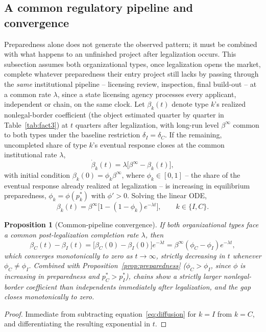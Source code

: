 \documentclass[english,12pt]{article}
\newtheorem{proposition}{Proposition}
\begin{document}
\subsection{A common regulatory pipeline and convergence}
\label{sec:diffusion}

Preparedness alone does not generate the observed pattern; it must be combined with what happens to an unfinished project after legalization occurs. This subsection assumes both organizational types, once legalization opens the market, complete whatever preparedness their entry project still lacks by passing through the \emph{same} institutional pipeline -- licensing review, inspection, final build-out -- at a common rate $\lambda$, since a state licensing agency processes every applicant, independent or chain, on the same clock. Let $\beta_k(t)$ denote type $k$'s realized nonlegal-border coefficient (the object estimated quarter by quarter in Table~\ref{tab:fact3}) at $t$ quarters after legalization, with long-run level $\beta^\infty$ common to both types under the baseline restriction $\delta_I=\delta_C$. If the remaining, uncompleted share of type $k$'s eventual response closes at the common institutional rate $\lambda$,
\[
\dot\beta_k(t) = \lambda\big[\beta^\infty-\beta_k(t)\big],
\]
with initial condition $\beta_k(0)=\phi_k\beta^\infty$, where $\phi_k\in[0,1]$ -- the share of the eventual response already realized at legalization -- is increasing in equilibrium preparedness, $\phi_k=\phi(p_k^*)$ with $\phi'>0$. Solving the linear ODE,
\begin{equation}
\label{eq:diffusion}
\beta_k(t) = \beta^\infty\big[1-(1-\phi_k)e^{-\lambda t}\big], \qquad k\in\{I,C\}.
\end{equation}

\begin{proposition}[Common-pipeline convergence]
\label{prop:convergence}
If both organizational types face a common post-legalization completion rate $\lambda$, then
\[
\beta_C(t)-\beta_I(t) = \big[\beta_C(0)-\beta_I(0)\big]e^{-\lambda t} = \beta^\infty(\phi_C-\phi_I)e^{-\lambda t},
\]
which converges monotonically to zero as $t\to\infty$, strictly decreasing in $t$ whenever $\phi_C\neq\phi_I$. Combined with Proposition~\ref{prop:preparedness} ($\phi_C>\phi_I$, since $\phi$ is increasing in preparedness and $p_C^*>p_I^*$), chains show a strictly larger nonlegal-border coefficient than independents immediately after legalization, and the gap closes monotonically to zero.
\end{proposition}
\begin{proof}
Immediate from subtracting equation~\eqref{eq:diffusion} for $k=I$ from $k=C$, and differentiating the resulting exponential in $t$.
\end{proof}
\end{document}
